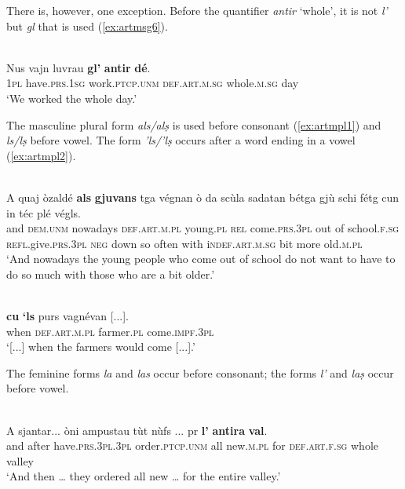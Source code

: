 There is, however, one exception. Before the quantifier \textit{antir} `whole', it is not \textit{l'} but \textit{gl} that is used (\ref{ex:artmsg6}).

\ea\label{ex:artmsg6}
\\
\gll  Nus vajn luvrau \textbf{gl'} \textbf{antir} \textbf{dé}.  \\
\textsc{1pl} have.\textsc{prs.1sg} work.\textsc{ptcp.unm} \textsc{def.art.m.sg} whole.\textsc{m.sg} day\\
\glt `We worked the whole day.'
\z

The masculine plural form \textit{als/alṣ} is used before consonant (\ref{ex:artmpl1}) and \textit{ls/lṣ} before vowel. The form \textit{'ls/'lṣ} occurs after a word ending in a vowel (\ref{ex:artmpl2}).

\ea
\label{ex:artmpl1}
\\
\gll A quaj òzaldé \textbf{als} \textbf{gjuvans} tga végnan ò da scùla sadatan bétga gjù schi fétg cun in téc plé végls.   \\
and \textsc{dem.unm} nowadays \textsc{def.art.m.pl} young.\textsc{pl} \textsc{rel} come.\textsc{prs.3pl} out of school.\textsc{f.sg} \textsc{refl}.give.\textsc{prs.3pl} \textsc{neg} down so often with i\textsc{ndef.art.m.sg} bit more old.\textsc{m.pl}\\
\glt `And nowadays the young people who come out of school do not want to have to do so much with those who are a bit older.'
\z

\ea
\label{ex:artmpl2}
\\
\gll [...] \textbf{cu} \textbf{`ls} purs vagnévan [...].\\
{} when \textsc{def.art.m.pl} farmer.\textsc{pl} come.\textsc{impf.3pl}\\
\glt `[...] when the farmers would come [...].'
\z

The feminine forms \textit{la} and \textit{las} occur before consonant; the forms \textit{l'} and \textit{laṣ} occur before vowel.

\ea
{}\\
\gll A sjantar... òni ampustau tùt nùfs ... pr \textbf{l'} \textbf{antira} \textbf{val}.\\
and after have.\textsc{prs.3pl.3pl} order.\textsc{ptcp.unm} all new.\textsc{m.pl} {} for \textsc{def.art.f.sg} whole valley\\
\glt `And then … they ordered all new … for the entire valley.'
\z

